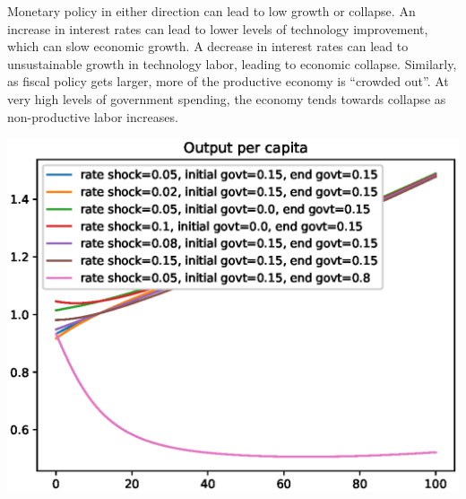 \documentclass[12pt]{article}
\theoremstyle{definition}
\begin{document}
Monetary policy in either direction can lead to low growth or collapse.  An increase in interest rates can lead to lower levels of technology improvement, which can slow economic growth.  A decrease in interest rates can lead to unsustainable growth in technology labor, leading to economic collapse.  Similarly, as fiscal policy gets larger, more of the productive economy is ``crowded out''.  At very high levels of government spending, the economy tends towards collapse as non-productive labor increases.     

\begin{minipage}[c]{0.8\linewidth}
\begin{framed}
\centering
\includegraphics[width=1\textwidth]{images/economy_0}
\end{framed}
\end{minipage}
\end{document}

